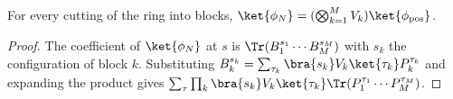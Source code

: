 \begin{lemma}
    \label{thm:ldp_chain_state_eq_pos}
    \leanok
    For every cutting of the ring into blocks,
    $\ket{\phi_N}=(\bigotimes_{k=1}^MV_k)\ket{\phi_{\mathrm{pos}}}$.
\end{lemma}
\begin{proof}
    \leanok
    The coefficient of $\ket{\phi_N}$ at $s$ is
    $\Tr(B_1^{s_1}\cdots B_M^{s_M})$ with $s_k$ the configuration of block $k$.
    Substituting $B_k^{s_k}=\sum_{\tau_k}\bra{s_k}V_k\ket{\tau_k}P_k^{\tau_k}$
    and expanding the product gives
    $\sum_\tau\prod_k\bra{s_k}V_k\ket{\tau_k}\Tr(P_1^{\tau_1}\cdots P_M^{\tau_M})$.
\end{proof}

